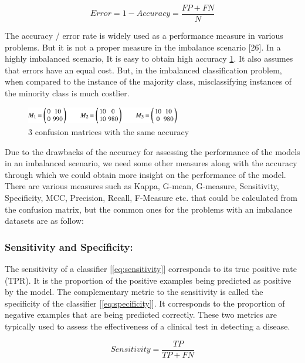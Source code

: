 \begin{equation}
    Error = 1-Accuracy = \frac{FP+FN}{N} 
    \label{eq:errorRate}
\end{equation}

The accuracy / error rate is widely used as a performance measure in various problems. 
But it is not a proper measure in the imbalance scenario [26]. In a highly imbalanced 
scenario, It is easy to obtain high accuracy \ref{fig:confusionMatrixSameAccuracy}. 
It also assumes that errors have an equal cost. But, in the imbalanced classification 
problem, when compared to the instance of the majority class, misclassifying instances 
of the minority class is much costlier.

\begin{figure}[ht]
    \centering
    \includegraphics[width=0.60\textwidth]{figures/11ConfusionSameAccuracy.png}
    \caption{3 confusion matrices with the same accuracy}
    \label{fig:confusionMatrixSameAccuracy}
\end{figure}

Due to the drawbacks of the accuracy for assessing the performance of the models in an 
imbalanced scenario, we need some other measures along with the accuracy through which 
we could obtain more insight on the performance of the model. There are various measures 
such as Kappa, G-mean, G-measure, Sensitivity, Specificity, MCC, Precision, Recall, 
F-Measure etc. that could be calculated from the confusion matrix, but the common ones 
for the problems with an imbalance datasets are as follow:

\subsubsection{Sensitivity and Specificity:}

The sensitivity of a classifier [\ref{eq:sensitivity}] corresponds to its true positive rate (TPR). 
It is the proportion of the positive examples being predicted as positive by the model. 
The complementary metric to the sensitivity is called the specificity of the classifier 
[\ref{eq:specificity}]. It corresponds to the proportion of negative examples that are being 
predicted correctly. These two metrics are typically used to assess the effectiveness of 
a clinical test in detecting a disease.

\begin{equation}
    Sensitivity = \frac{TP}{TP+FN} 
    \label{eq:sensitivity}
\end{equation}

